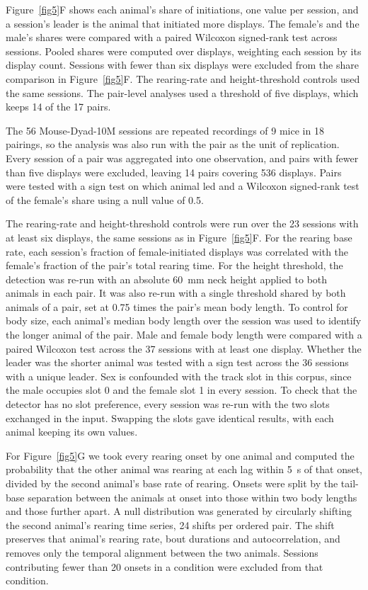 \documentclass[pdflatex, sn-nature]{sn-jnl}
\theoremstyle{thmstyleone}%
\theoremstyle{thmstyletwo}%
\theoremstyle{thmstylethree}%
\begin{document}
Figure~\ref{fig5}F shows each animal's share of initiations, one value per session, and a session's leader is the animal that initiated more displays. The female's and the male's shares were compared with a paired Wilcoxon signed-rank test across sessions. Pooled shares were computed over displays, weighting each session by its display count. Sessions with fewer than six displays were excluded from the share comparison in Figure~\ref{fig5}F. The rearing-rate and height-threshold controls used the same sessions. The pair-level analyses used a threshold of five displays, which keeps 14 of the 17 pairs.

The 56 Mouse-Dyad-10M sessions are repeated recordings of 9 mice in 18 pairings, so the analysis was also run with the pair as the unit of replication. Every session of a pair was aggregated into one observation, and pairs with fewer than five displays were excluded, leaving 14 pairs covering 536 displays. Pairs were tested with a sign test on which animal led and a Wilcoxon signed-rank test of the female's share using a null value of 0.5.

The rearing-rate and height-threshold controls were run over the 23 sessions with at least six displays, the same sessions as in Figure~\ref{fig5}F. For the rearing base rate, each session's fraction of female-initiated displays was correlated with the female's fraction of the pair's total rearing time. For the height threshold, the detection was re-run with an absolute 60~mm neck height applied to both animals in each pair. It was also re-run with a single threshold shared by both animals of a pair, set at 0.75 times the pair's mean body length. To control for body size, each animal's median body length over the session was used to identify the longer animal of the pair. Male and female body length were compared with a paired Wilcoxon test across the 37 sessions with at least one display. Whether the leader was the shorter animal was tested with a sign test across the 36 sessions with a unique leader. Sex is confounded with the track slot in this corpus, since the male occupies slot 0 and the female slot 1 in every session. To check that the detector has no slot preference, every session was re-run with the two slots exchanged in the input. Swapping the slots gave identical results, with each animal keeping its own values.

For Figure~\ref{fig5}G we took every rearing onset by one animal and computed the probability that the other animal was rearing at each lag within 5~s of that onset, divided by the second animal's base rate of rearing. Onsets were split by the tail-base separation between the animals at onset into those within two body lengths and those further apart. A null distribution was generated by circularly shifting the second animal's rearing time series, 24 shifts per ordered pair. The shift preserves that animal's rearing rate, bout durations and autocorrelation, and removes only the temporal alignment between the two animals. Sessions contributing fewer than 20 onsets in a condition were excluded from that condition.
\end{document}
